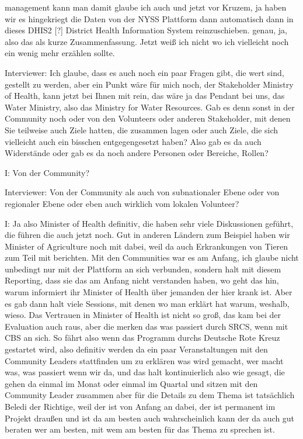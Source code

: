 management kann man damit glaube ich auch und jetzt vor Kruzem, ja haben wir es hingekriegt die Daten von der NYSS Plattform dann automatisch dann in dieses DHIS2 [?] District Health Information System reinzuschieben. genau, ja, also das als kurze Zusammenfassung. Jetzt weiß ich nicht wo ich vielleicht noch ein wenig mehr erzählen sollte. 

Interviewer: Ich glaube, dass es auch noch ein paar Fragen gibt, die wert sind, gestellt zu werden, aber ein Punkt wäre für mich noch, der Stakeholder Ministry of Health, kann jetzt bei Ihnen mit rein, das wäre ja das Pendant bei uns, das Water Ministry, also das Ministry for Water Resources. Gab es denn sonst in der Community noch oder von den Volunteers oder anderen Stakeholder, mit denen Sie teilweise auch Ziele hatten, die zusammen lagen oder auch Ziele, die sich vielleicht auch ein bisschen entgegengesetzt haben? Also gab es da auch Widerstände oder gab es da noch andere Personen oder Bereiche, Rollen?

I: Von der Community?

Interviewer: Von der Community als auch von subnationaler Ebene oder von regionaler Ebene oder eben auch wirklich vom lokalen Volunteer? 

I: Ja also Minister of Health definitiv, die haben sehr viele Diskussionen geführt, die führen die auch jetzt noch. Gut in anderen Ländern zum Beispiel haben wir Minister of Agriculture noch mit dabei, weil da auch Erkrankungen von Tieren zum Teil mit berichten. Mit den Communities war es am Anfang, ich glaube nicht unbedingt nur mit der Plattform an sich verbunden, sondern halt mit diesem Reporting, dass sie das am Anfang nicht verstanden haben, wo geht das hin, warum informiert ihr Minister of Health über jemanden der hier krank ist. Aber es gab dann halt viele Sessions, mit denen wo man erklärt hat warum, weshalb, wieso. Das Vertrauen in Minister of Health ist nicht so groß, das kam bei der Evaluation auch raus, aber die merken das was passiert durch SRCS, wenn mit CBS an sich. So fährt also wenn das Programm durchs Deutsche Rote Kreuz gestartet wird, also definitiv werden da ein paar Veranstaltungen mit den Community Leaders stattfinden um zu erklären was wird gemacht, wer macht was, was passiert wenn wir da, und das halt kontinuierlich also wie gesagt, die gehen da einmal im Monat oder einmal im Quartal und sitzen mit den Community Leader zusammen aber für die Details zu dem Thema ist tatsächlich Beledi der Richtige, weil der ist von Anfang an dabei, der ist permanent im Projekt draußen und ist da am besten auch wahrscheinlich kann der da auch gut beraten wer am besten, mit wem am besten für das Thema zu sprechen ist. 

